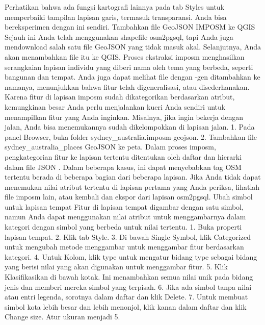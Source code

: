 \begin{enumerate}
Perhatikan bahwa ada fungsi kartografi lainnya pada tab Styles untuk memperbaiki tampilan lapisan garis, termasuk transparansi. Anda bisa bereksperimen dengan ini sendiri.
Tambahkan file GeoJSON IMPOSM ke QGIS
Sejauh ini Anda telah menggunakan shapefile osm2pgsql, tapi Anda juga mendownload salah satu file GeoJSON yang tidak masuk akal. Selanjutnya, Anda akan menambahkan file itu ke QGIS.
Proses ekstraksi imposm menghasilkan serangkaian lapisan individu yang diberi nama oleh tema yang berbeda, seperti bangunan dan tempat. Anda juga dapat melihat file dengan -gen ditambahkan ke namanya, menunjukkan bahwa fitur telah digeneralisasi, atau disederhanakan. Karena fitur di lapisan imposm sudah dikategorikan berdasarkan atribut, kemungkinan besar Anda perlu menjalankan kueri Anda sendiri untuk menampilkan fitur yang Anda inginkan. Misalnya, jika ingin bekerja dengan jalan, Anda bisa menemukannya sudah dikelompokkan di lapisan jalan.
1.	Pada panel Browser, buka folder sydney_australia.imposm-geojson.
2.	Tambahkan file sydney_australia_places GeoJSON ke peta.
Dalam proses imposm, pengkategorian fitur ke lapisan tertentu ditentukan oleh daftar dan hierarki dalam file JSON . Dalam beberapa kasus, ini dapat menyebabkan tag OSM tertentu berada di beberapa bagian dari beberapa lapisan. Jika Anda tidak dapat menemukan nilai atribut tertentu di lapisan pertama yang Anda periksa, lihatlah file imposm lain, atau kembali dan ekspor dari lapisan osm2pgsql.
Ubah simbol untuk lapisan tempat
Fitur di lapisan tempat digambar dengan satu simbol, namun Anda dapat menggunakan nilai atribut untuk menggambarnya dalam kategori dengan simbol yang berbeda untuk nilai tertentu.
1.	Buka properti lapisan tempat.
2.	Klik tab Style.
3.	Di bawah Single Symbol, klik Categorized untuk mengubah metode menggambar untuk menggambar fitur berdasarkan kategori.
4.	Untuk Kolom, klik type untuk mengatur bidang type sebagai bidang yang berisi nilai yang akan digunakan untuk menggambar fitur.
5.	Klik Klasifikasikan di bawah kotak. Ini menambahkan semua nilai unik pada bidang jenis dan memberi mereka simbol yang terpisah.
6.	Jika ada simbol tanpa nilai atau entri legenda, sorotnya dalam daftar dan klik Delete.
7.	Untuk membuat simbol kota lebih besar dan lebih menonjol, klik kanan dalam daftar dan klik Change size. Atur ukuran menjadi 5.
 

\end{enumerate}
